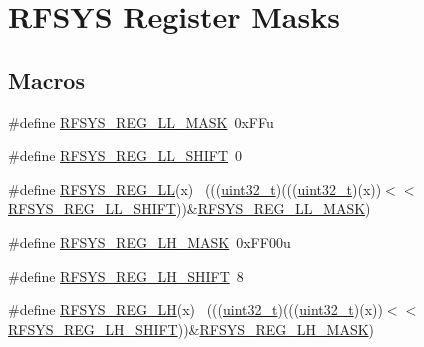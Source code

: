 \hypertarget{group___r_f_s_y_s___register___masks}{}\section{R\+F\+S\+YS Register Masks}
\label{group___r_f_s_y_s___register___masks}
\subsection*{Macros}
\begin{DoxyCompactItemize}
\item 
\#define \hyperlink{group___r_f_s_y_s___register___masks_ga2fe64579aaef18ce266e3d6c316d3241}{R\+F\+S\+Y\+S\+\_\+\+R\+E\+G\+\_\+\+L\+L\+\_\+\+M\+A\+SK}~0x\+F\+Fu
\item 
\#define \hyperlink{group___r_f_s_y_s___register___masks_gaab45c60c0a8e5edb59537ee2bcb2bbcf}{R\+F\+S\+Y\+S\+\_\+\+R\+E\+G\+\_\+\+L\+L\+\_\+\+S\+H\+I\+FT}~0
\item 
\#define \hyperlink{group___r_f_s_y_s___register___masks_ga605e2a9b11854ce01ce33ab06ee481ab}{R\+F\+S\+Y\+S\+\_\+\+R\+E\+G\+\_\+\+LL}(x)                                                ~(((\hyperlink{_p_e___types_8h_a33594304e786b158f3fb30289278f5af}{uint32\+\_\+t})(((\hyperlink{_p_e___types_8h_a33594304e786b158f3fb30289278f5af}{uint32\+\_\+t})(x))$<$$<$\hyperlink{group___r_f_s_y_s___register___masks_gaab45c60c0a8e5edb59537ee2bcb2bbcf}{R\+F\+S\+Y\+S\+\_\+\+R\+E\+G\+\_\+\+L\+L\+\_\+\+S\+H\+I\+FT}))\&\hyperlink{group___r_f_s_y_s___register___masks_ga2fe64579aaef18ce266e3d6c316d3241}{R\+F\+S\+Y\+S\+\_\+\+R\+E\+G\+\_\+\+L\+L\+\_\+\+M\+A\+SK})
\item 
\#define \hyperlink{group___r_f_s_y_s___register___masks_ga9f8ddcb45324c34fd2d19417b8b13d11}{R\+F\+S\+Y\+S\+\_\+\+R\+E\+G\+\_\+\+L\+H\+\_\+\+M\+A\+SK}~0x\+F\+F00u
\item 
\#define \hyperlink{group___r_f_s_y_s___register___masks_gabe96c857aab7668805c1fb3ea46693bf}{R\+F\+S\+Y\+S\+\_\+\+R\+E\+G\+\_\+\+L\+H\+\_\+\+S\+H\+I\+FT}~8
\item 
\#define \hyperlink{group___r_f_s_y_s___register___masks_ga9e5f30d82693f4f97b51b6459c3dc590}{R\+F\+S\+Y\+S\+\_\+\+R\+E\+G\+\_\+\+LH}(x)                                                ~(((\hyperlink{_p_e___types_8h_a33594304e786b158f3fb30289278f5af}{uint32\+\_\+t})(((\hyperlink{_p_e___types_8h_a33594304e786b158f3fb30289278f5af}{uint32\+\_\+t})(x))$<$$<$\hyperlink{group___r_f_s_y_s___register___masks_gabe96c857aab7668805c1fb3ea46693bf}{R\+F\+S\+Y\+S\+\_\+\+R\+E\+G\+\_\+\+L\+H\+\_\+\+S\+H\+I\+FT}))\&\hyperlink{group___r_f_s_y_s___register___masks_ga9f8ddcb45324c34fd2d19417b8b13d11}{R\+F\+S\+Y\+S\+\_\+\+R\+E\+G\+\_\+\+L\+H\+\_\+\+M\+A\+SK})

\end{DoxyCompactItemize}
